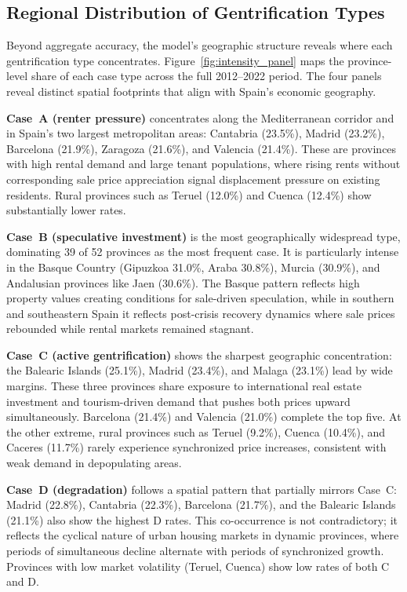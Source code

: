 \documentclass[12pt,a4paper]{article}
\begin{document}
\subsection{Regional Distribution of Gentrification Types}

Beyond aggregate accuracy, the model's geographic structure reveals where each gentrification type concentrates. Figure~\ref{fig:intensity_panel} maps the province-level share of each case type across the full 2012--2022 period. The four panels reveal distinct spatial footprints that align with Spain's economic geography.

\textbf{Case~A (renter pressure)} concentrates along the Mediterranean corridor and in Spain's two largest metropolitan areas: Cantabria (23.5\%), Madrid (23.2\%), Barcelona (21.9\%), Zaragoza (21.6\%), and Valencia (21.4\%). These are provinces with high rental demand and large tenant populations, where rising rents without corresponding sale price appreciation signal displacement pressure on existing residents. Rural provinces such as Teruel (12.0\%) and Cuenca (12.4\%) show substantially lower rates.

\textbf{Case~B (speculative investment)} is the most geographically widespread type, dominating 39 of 52 provinces as the most frequent case. It is particularly intense in the Basque Country (Gipuzkoa 31.0\%, Araba 30.8\%), Murcia (30.9\%), and Andalusian provinces like Jaen (30.6\%). The Basque pattern reflects high property values creating conditions for sale-driven speculation, while in southern and southeastern Spain it reflects post-crisis recovery dynamics where sale prices rebounded while rental markets remained stagnant.

\textbf{Case~C (active gentrification)} shows the sharpest geographic concentration: the Balearic Islands (25.1\%), Madrid (23.4\%), and Malaga (23.1\%) lead by wide margins. These three provinces share exposure to international real estate investment and tourism-driven demand that pushes both prices upward simultaneously. Barcelona (21.4\%) and Valencia (21.0\%) complete the top five. At the other extreme, rural provinces such as Teruel (9.2\%), Cuenca (10.4\%), and Caceres (11.7\%) rarely experience synchronized price increases, consistent with weak demand in depopulating areas.

\textbf{Case~D (degradation)} follows a spatial pattern that partially mirrors Case~C: Madrid (22.8\%), Cantabria (22.3\%), Barcelona (21.7\%), and the Balearic Islands (21.1\%) also show the highest D rates. This co-occurrence is not contradictory; it reflects the cyclical nature of urban housing markets in dynamic provinces, where periods of simultaneous decline alternate with periods of synchronized growth. Provinces with low market volatility (Teruel, Cuenca) show low rates of both C and D.
\end{document}
